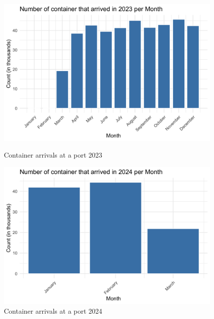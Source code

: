 			\begin{figure}[ht]
				\centering
				\begin{minipage}{0.5\textwidth}
					\centering
					\includegraphics[width=\textwidth]{images/du_zero_one}
					\caption{Container arrivals at a port 2023}
					\label{fig:du_containers_arrivals_2023}
				\end{minipage}%
				\hfill
				\begin{minipage}{0.5\textwidth}
					\centering
					\includegraphics[width=\textwidth]{images/du_zero_two}
					\caption{Container arrivals at a port 2024}
					\label{fig:du_containers_arrivals_2024}
				\end{minipage}
			\end{figure}

